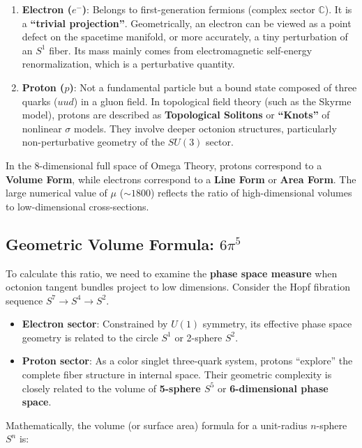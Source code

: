 \begin{enumerate}
\item \textbf{Electron ($e^-$)}: Belongs to first-generation fermions (complex sector $\mathbb{C}$). It is a \textbf{``trivial projection''}. Geometrically, an electron can be viewed as a point defect on the spacetime manifold, or more accurately, a tiny perturbation of an $S^1$ fiber. Its mass mainly comes from electromagnetic self-energy renormalization, which is a perturbative quantity.
\item \textbf{Proton ($p$)}: Not a fundamental particle but a bound state composed of three quarks ($uud$) in a gluon field. In topological field theory (such as the Skyrme model), protons are described as \textbf{Topological Solitons} or \textbf{``Knots''} of nonlinear $\sigma$ models. They involve deeper octonion structures, particularly non-perturbative geometry of the $SU(3)$ sector.
\end{enumerate}

In the 8-dimensional full space of Omega Theory, protons correspond to a \textbf{Volume Form}, while electrons correspond to a \textbf{Line Form} or \textbf{Area Form}. The large numerical value of $\mu$ ($\sim 1800$) reflects the ratio of high-dimensional volumes to low-dimensional cross-sections.

\subsection{Geometric Volume Formula: \texorpdfstring{$6\pi^5$}{6pi5}}

To calculate this ratio, we need to examine the \textbf{phase space measure} when octonion tangent bundles project to low dimensions.
Consider the Hopf fibration sequence $S^7 \to S^4 \to S^2$.

\begin{itemize}
\item \textbf{Electron sector}: Constrained by $U(1)$ symmetry, its effective phase space geometry is related to the circle $S^1$ or 2-sphere $S^2$.
\item \textbf{Proton sector}: As a color singlet three-quark system, protons ``explore'' the complete fiber structure in internal space. Their geometric complexity is closely related to the volume of \textbf{5-sphere $S^5$} or \textbf{6-dimensional phase space}.
\end{itemize}

Mathematically, the volume (or surface area) formula for a unit-radius $n$-sphere $S^n$ is:

